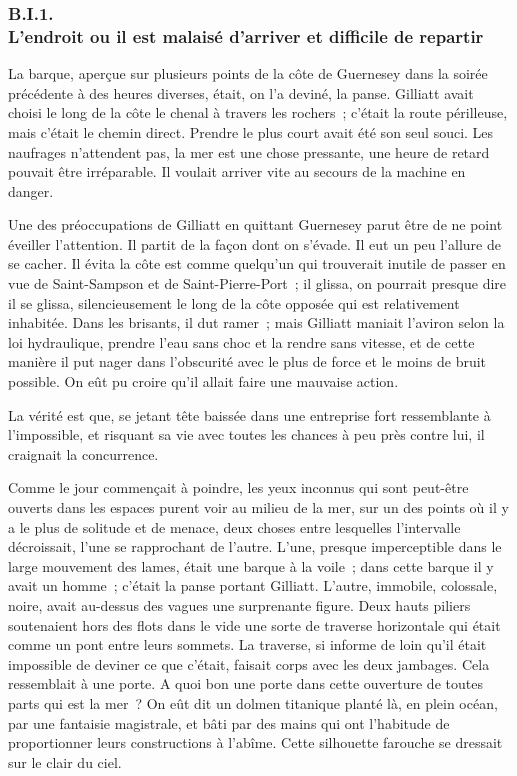 \documentclass[french,twoside]{book} %
\begin{document}
  \subsubsection[{B.I.1. L’endroit ou il est malaisé d’arriver et difficile de repartir}]{B.I.1. \\
L’endroit ou il est malaisé d’arriver et difficile de repartir}
\noindent La barque, aperçue sur plusieurs points de la côte de Guernesey dans la soirée précédente à des heures diverses, était, on l’a deviné, la panse. Gilliatt avait choisi le long de la côte le chenal à travers les rochers ; c’était la route périlleuse, mais c’était le chemin direct. Prendre le plus court avait été son seul souci. Les naufrages n’attendent pas, la mer est une chose pressante, une heure de retard pouvait être irréparable. Il voulait arriver vite au secours de la machine en danger.\par
Une des préoccupations de Gilliatt en quittant Guernesey parut être de ne point éveiller l’attention. Il partit de la façon dont on s’évade. Il eut un peu l’allure de se cacher. Il évita la côte est comme quelqu’un qui trouverait inutile de passer en vue de Saint-Sampson et de Saint-Pierre-Port ; il glissa, on pourrait  presque dire il se glissa, silencieusement le long de la côte opposée qui est relativement inhabitée. Dans les brisants, il dut ramer ; mais Gilliatt maniait l’aviron selon la loi hydraulique, prendre l’eau sans choc et la rendre sans vitesse, et de cette manière il put nager dans l’obscurité avec le plus de force et le moins de bruit possible. On eût pu croire qu’il allait faire une mauvaise action.\par
La vérité est que, se jetant tête baissée dans une entreprise fort ressemblante à l’impossible, et risquant sa vie avec toutes les chances à peu près contre lui, il craignait la concurrence.\par
Comme le jour commençait à poindre, les yeux inconnus qui sont peut-être ouverts dans les espaces purent voir au milieu de la mer, sur un des points où il y a le plus de solitude et de menace, deux choses entre lesquelles l’intervalle décroissait, l’une se rapprochant de l’autre. L’une, presque imperceptible dans le large mouvement des lames, était une barque à la voile ; dans cette barque il y avait un homme ; c’était la panse portant Gilliatt. L’autre, immobile, colossale, noire, avait au-dessus des vagues une surprenante figure. Deux hauts piliers soutenaient hors des flots dans le vide une sorte de traverse horizontale qui était comme un pont entre leurs sommets. La traverse, si informe de loin qu’il était impossible de deviner ce que c’était, faisait corps avec les deux jambages. Cela ressemblait à une porte. A quoi bon une porte dans cette ouverture de toutes parts qui est la mer ? On eût dit un dolmen titanique planté là, en plein océan, par  une fantaisie magistrale, et bâti par des mains qui ont l’habitude de proportionner leurs constructions à l’abîme. Cette silhouette farouche se dressait sur le clair du ciel.\par
\end{document}
